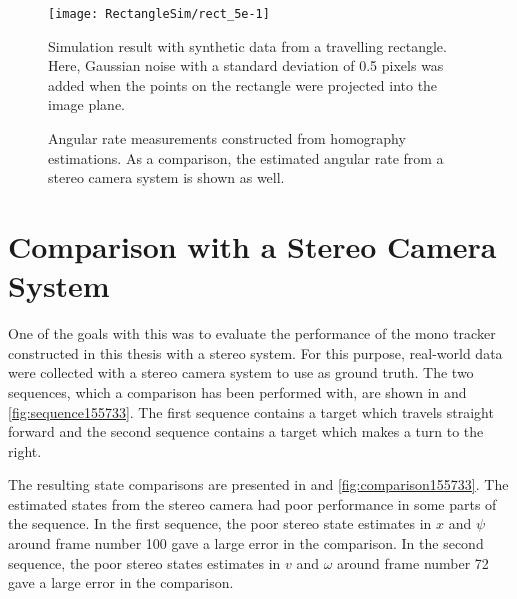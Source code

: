 \begin{figure}[!ht]
	\centering
	\texttt{[image: RectangleSim/rect\_5e-1]}
	\caption{\label{fig:rectsim5e-1} Simulation result with synthetic data from a travelling rectangle. Here, Gaussian noise with a standard deviation of 0.5 pixels was added when the points on the rectangle were projected into the image plane.}
\end{figure}

\begin{figure}[!ht]
	\centering

	\caption{\label{fig:angvelmeas} Angular rate measurements constructed from homography estimations. As a comparison, the estimated angular rate from a stereo camera system is shown as well.}
\end{figure}

\clearpage

\section{Comparison with a Stereo Camera System}
One of the goals with this \ms was to evaluate the performance of the mono tracker constructed in this thesis with a stereo system.
For this purpose, real-world data were collected with a stereo camera system to use as ground truth.
The two sequences, which a comparison has been performed with, are shown in  and \ref{fig:sequence155733}.
The first sequence contains a target which travels straight forward and the second sequence contains a target which makes a turn to the right.

The resulting state comparisons are presented in  and \ref{fig:comparison155733}.
The estimated states from the stereo camera had poor performance in some parts of the sequence.
In the first sequence, the poor stereo state estimates in $x$ and $\psi$ around frame number 100 gave a large error in the comparison.
In the second sequence, the poor stereo states estimates in $v$ and $\omega$ around frame number 72 gave a large error in the comparison.

